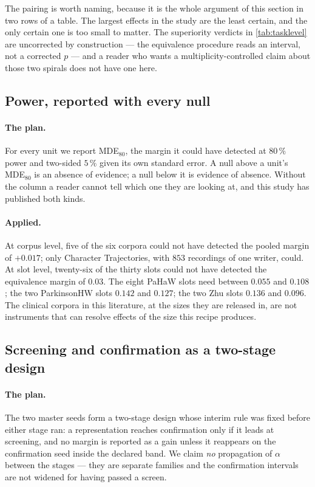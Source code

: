 The pairing is worth naming, because it is the whole argument of this section in two rows of a
table. The largest effects in the study are the least certain, and the only certain one is too small
to matter. The superiority verdicts in \cref{tab:tasklevel} are uncorrected by construction --- the
equivalence procedure reads an interval, not a corrected $p$ --- and a reader who wants a
multiplicity-controlled claim about those two spirals does not have one here.

\subsection{Power, reported with every null}
\label{sec:stats-power}

\paragraph{The plan.} For every unit we report MDE$_{80}$, the margin it could have detected at
$80\,\%$ power and two-sided $5\,\%$ given its own standard error. A null above a unit's
MDE$_{80}$ is an absence of evidence; a null below it is evidence of absence. Without the column a
reader cannot tell which one they are looking at, and this study has published both kinds.

\paragraph{Applied.} At corpus level, five of the six corpora could not have detected the pooled
margin of $+0.017$; only Character Trajectories, with $853$ recordings of one writer, could. At slot
level, twenty-six of the thirty slots could not have detected the equivalence margin of $0.03$. The
eight PaHaW slots need between $0.055$ and $0.108$; the two ParkinsonHW slots $0.142$ and $0.127$;
the two Zhu slots $0.136$ and $0.096$. The clinical corpora in this literature, at the sizes they
are released in, are not instruments that can resolve effects of the size this recipe produces.

\subsection{Screening and confirmation as a two-stage design}
\label{sec:stats-twostage}

\paragraph{The plan.} The two master seeds form a two-stage design whose interim rule was fixed
before either stage ran: a representation reaches confirmation only if it leads at screening, and no
margin is reported as a gain unless it reappears on the confirmation seed inside the declared band.
We claim \emph{no} propagation of $\alpha$ between the stages --- they are separate families and the
confirmation intervals are not widened for having passed a screen.

